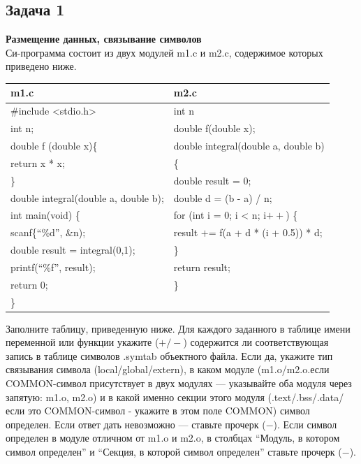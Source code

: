\documentclass[12pt, letterpaper]{article}
\begin{document}
\subsection{Задача 1}
\textbf{Размещение данных, связывание символов}\\
Си-программа состоит из двух модулей m1.c и m2.c, содержимое которых приведено ниже.
\begin{center}
    \begin{tabular}{|l||l|}
        \hline
        m1.c & m2.c\\
        \hline
        \hline
        \#include <stdio.h>                     & int n \\
        int n;                                  & double f(double x); \\
        double f (double x)\{                   & double integral(double a, double b) \\
            return x * x;                       & \{ \\
        \}                                      & double result = 0; \\
        double integral(double a, double b);    & double d = (b - a) / n; \\
        int main(void) \{                       & for (int i = 0; i < n; i$++$) \{ \\
            scanf\{``\%d'', \&n);               & result $+$= f(a + d * (i + 0.5)) * d; \\
            double result = integral(0,1);      & \} \\
            printf(``\%f'', result);            & return result; \\
            return 0;                           & \} \\
        \}                                      & \\
        \hline
    \end{tabular}
\end{center}
Заполните таблицу, приведенную ниже. Для каждого заданного в таблице имени переменной или функции укажите ($+/-$) содержится ли соответствующая запись в таблице символов .symtab объектного файла. Если да, укажите тип связывания символа (local/global/extern), в каком модуле (m1.o/m2.o.если COMMON-символ присутствует в двух модулях — указывайте оба модуля через запятую: m1.o, m2.o) и в какой именно секции этого модуля (.text/.bss/.data/если это COMMON-символ - укажите в этом поле COMMON) символ определен. Если ответ дать невозможно — ставьте прочерк ($-$). Если символ определен в модуле отличном от m1.o и m2.o, в столбцах ``Модуль, в котором символ определен'' и ``Секция, в которой символ определен'' ставьте прочерк ($-$).
\end{document}
